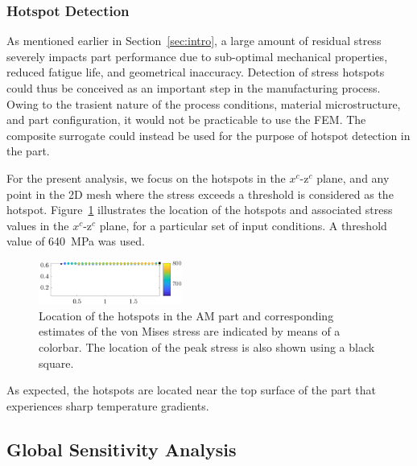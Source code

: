 \subsubsection{Hotspot Detection}
\label{subsub:hotspot}

As mentioned earlier in Section~\ref{sec:intro}, a large amount of residual stress severely impacts part
performance due to sub-optimal mechanical properties, reduced fatigue life, and geometrical inaccuracy. 
Detection of stress hotspots could thus be conceived as an important step in the manufacturing process.
Owing to the trasient nature of the process conditions, material microstructure, and part configuration,
it would not be practicable to use the FEM. The composite surrogate could instead be used for the purpose
of hotspot detection in the part. 

For the present analysis, we focus on the hotspots in the $x^c$-z$^c$ plane, and any point in the 2D mesh
where the stress exceeds a threshold is considered as the hotspot. Figure~\ref{fig:hs} illustrates the 
location of the hotspots and associated stress values in the $x^c$-z$^c$ plane, for a particular set of
input conditions. A threshold value of 640~MPa was used. 
%
\begin{figure}[htbp]
\begin{center}
\includegraphics[width=0.42\textwidth]{./Figures/loc_hotspot10}
\end{center}
\caption{Location of the hotspots in the AM part and corresponding estimates of the von Mises stress
are indicated by means of a colorbar. The location of the peak stress is also shown using a black square.}
\label{fig:hs}
\end{figure}
%
As expected, the hotspots are located near the top surface of the part that experiences sharp temperature
gradients. 

\subsection{Global Sensitivity Analysis}
\label{sub:gsa}

